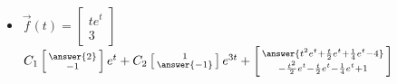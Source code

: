 \documentclass{ximera}
\begin{document}
\begin{exercise}
\begin{itemize}
        \item $\vec{f}(t) = \begin{bmatrix} te^{t} \\ 3 \end{bmatrix}$\\
            $C_1\left[\begin{smallmatrix} \answer{2} \\ -1 \end{smallmatrix}\right]e^{t} + C_2\left[\begin{smallmatrix} 1 \\ \answer{-1} \end{smallmatrix}\right]e^{3t} + \left[\begin{smallmatrix} \answer{t^2e^t + \frac{t}{2}e^t + \frac{1}{4}e^t - 4} \\ -\frac{t^2}{2}e^t - \frac{t}{2}e^t - \frac{1}{4}e^t + 1 \end{smallmatrix}\right]$
    \end{itemize} 
\end{exercise}
\end{document}
